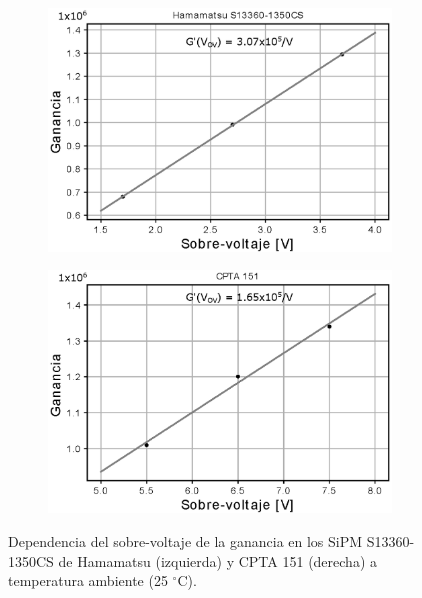 \begin{figure}[h!]
     \centering
     \begin{subfigure}[b]{0.49\textwidth}
         \centering
         \includegraphics[width=1.1\textwidth]{Images/GOV_1350CS.eps}
         \caption{}
         \label{fig:Gov_1350CS}
     \end{subfigure}
     \begin{subfigure}[b]{0.49\textwidth}
         \centering
         \includegraphics[width=1.1\textwidth]{Images/GOV_CPTA.eps}
         \caption{}
         \label{fig:Gov_CPTA}
     \end{subfigure}
        \caption{Dependencia del sobre-voltaje de la ganancia en los SiPM S13360-1350CS de Hamamatsu (izquierda) y CPTA 151 (derecha) a temperatura ambiente (25 $^\circ$C).}
        \label{fig:Gain_vs_ov}
\end{figure}
